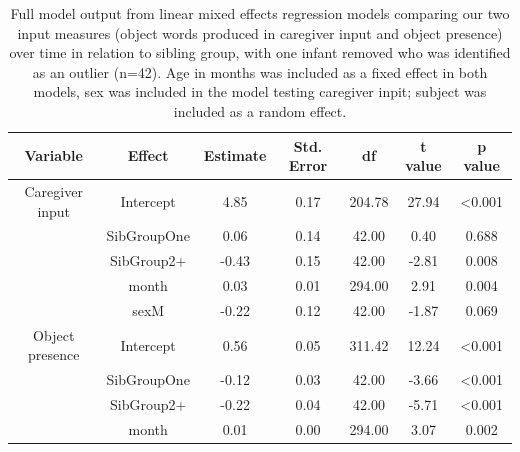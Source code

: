 \documentclass[
  man,mask,floatsintext]{apa6}
\begin{document}
\begin{longtable}[t]{ccccccc}
\caption{\label{tab:table-input-model-summary-red}Full model output from linear mixed effects regression models comparing our two input measures (object words produced in caregiver input and object presence) over time in relation to sibling group, with one infant removed who was identified as an outlier (n=42). Age in months was included as a fixed effect in both models, sex was included in the model testing caregiver inpit; subject was included as a random effect.}\\
\toprule
Variable & Effect & Estimate & Std. Error & df & t value & p value\\
\midrule
Caregiver input & Intercept & 4.85 & 0.17 & 204.78 & 27.94 & <0.001\\
 & SibGroupOne & 0.06 & 0.14 & 42.00 & 0.40 & 0.688\\
 & SibGroup2+ & -0.43 & 0.15 & 42.00 & -2.81 & 0.008\\
 & month & 0.03 & 0.01 & 294.00 & 2.91 & 0.004\\
 & sexM & -0.22 & 0.12 & 42.00 & -1.87 & 0.069\\
\midrule
\addlinespace
Object presence & Intercept & 0.56 & 0.05 & 311.42 & 12.24 & <0.001\\
 & SibGroupOne & -0.12 & 0.03 & 42.00 & -3.66 & <0.001\\
 & SibGroup2+ & -0.22 & 0.04 & 42.00 & -5.71 & <0.001\\
 & month & 0.01 & 0.00 & 294.00 & 3.07 & 0.002\\
\bottomrule
\end{longtable}
\end{document}
